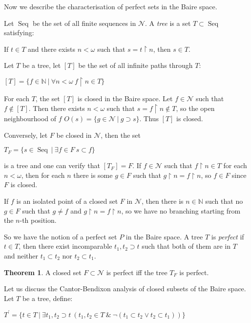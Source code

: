 \documentclass[8pt]{article}
\theoremstyle{definition}
\theoremstyle{definition}
\newtheorem{theorem}{Theorem}[section]
\theoremstyle{definition}
\theoremstyle{definition}
\theoremstyle{definition}
\theoremstyle{definition}
\theoremstyle{definition}
\theoremstyle{definition}
\theoremstyle{definition}
\theoremstyle{definition}
\theoremstyle{definition}
\theoremstyle{definition}
\theoremstyle{definition}
\theoremstyle{definition}
\theoremstyle{question}
\begin{document}
Now we describe the characterisation of perfect sets in the Baire space.

Let $\operatorname{Seq}$ be the set of all finite sequences in $\mathcal{N}$. 
A \emph{tree} is a set $T \subset \operatorname{Seq}$ satisfying:
\begin{center}
  If $t \in T$ and there exists $n < \omega$ such that $s = t \upharpoonright n$, then $s \in T$.
\end{center}

Let $T$ be a tree, let $[T]$ be the set of all infinite paths through $T$:
\begin{center}
  $[T] = \{ f \in \mathbb{N} \: | \: \forall n < \omega \: f \upharpoonright n \in T \}$
\end{center}

For each $T$, the set $[T]$ is closed in the Baire space. Let $f \in \mathcal{N}$
such that $f \notin [T]$. Then there exists $n < \omega$ such that $s = f \upharpoonright n \notin T$, 
so the open neighbourhood of $f$ $O(s) = \{ g \in \mathcal{N} \: | \: g \supset s \}$. Thus $[T]$ is closed.

Conversely, let $F$ be closed in $\mathcal{N}$, then the set
\begin{center}
  $T_F = \{ s \in \operatorname{Seq} \: | \: \exists f \in F \: s \subset f \}$
\end{center}
is a tree and one can verify that $[T_F] = F$. If $f \in \mathcal{N}$ such that $f \upharpoonright n \in T$
for each $n < \omega$, then for each $n$ there is some $g \in F$ such that 
$g \upharpoonright n = f \upharpoonright n$, so $f \in F$ since $F$ is closed.

If $f$ is an isolated point of a closed set $F$ in $\mathcal{N}$, then there is $n \in \mathbb{N}$ such that no
$g \in F$ such that $g \neq f$ and $g \upharpoonright n = f \upharpoonright n$, so we have no branching starting from the
$n$-th position.

So we have the notion of a perfect set $P$ in the Baire space. A tree $T$ is \emph{perfect} if $t \in T$, then there
exist incomparable $t_1, t_2 \supset t$ such that both of them are in $T$ and neither $t_1 \subset t_2$ nor $t_2 \subset t_1$.

\begin{theorem}
  A closed set $F \subset \mathcal{N}$ is perfect iff the tree $T_F$ is perfect.
\end{theorem}

Let us discuss the Cantor-Bendixon analysis of closed subsets of the Baire space. Let $T$ be a tree, define:
\begin{center}
  $T^{'} = \{ t \in T \: | \: \exists t_1, t_2 \supset t \: (t_1, t_2 \in T \: \& \: \neg (t_1 \subset t_2 \lor t_2 \subset t_1))\}$
\end{center}
\end{document}
